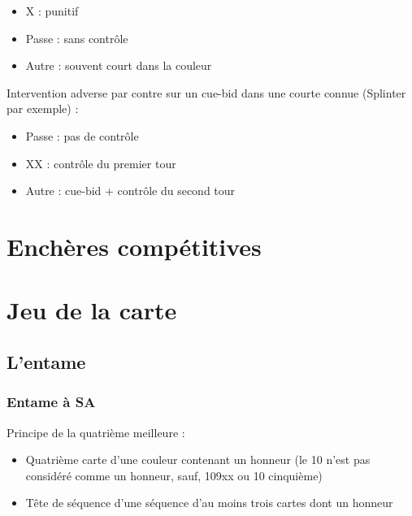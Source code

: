 \documentclass[a4paper]{article}
\begin{document}
\begin{itemize}
\item X : punitif

\item Passe : sans contrôle

\item Autre : souvent court dans la couleur

\end{itemize}

Intervention adverse par contre sur un cue-bid dans une courte connue (Splinter par exemple) :

\begin{itemize}
\item Passe : pas de contrôle

\item XX : contrôle du premier tour

\item Autre : cue-bid + contrôle du second tour

\end{itemize}

\section{Enchères compétitives}

\section{Jeu de la carte}

\subsection{L'entame}

\subsubsection{Entame à SA}

Principe de la quatrième meilleure :

\begin{itemize}
\item Quatrième carte d'une couleur contenant un honneur (le 10 n'est pas considéré comme un honneur, sauf, 109xx ou 10 cinquième)

\end{itemize}

\begin{itemize}
\item Tête de séquence d'une séquence d'au moins trois cartes dont un honneur

\end{itemize}
\end{document}
